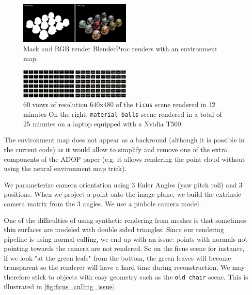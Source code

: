 \begin{figure}[H]
    \centering
    \includegraphics[width=0.5\textwidth]{figures/blenderproc_renders.png}
    \caption{Mask and RGB render BlenderProc renders with an environment map.}
    \label{fig:blenderproc_renders}
\end{figure}

\begin{figure}[H]
    \centering
    \includegraphics[width=0.5\textwidth]{figures/ficus_and_matballs.png}
    \caption{60 views of resolution 640x480 of the \texttt{Ficus} scene rendered in 12 minutes On the right, \texttt{material balls} scene rendered in a total of 25 minutes on a laptop equipped with a Nvidia T500.}
    \label{fig:multiview}
\end{figure}

The environment map does not appear as a backround (although it is possible in the current code) as it would allow to simplify and remove one of the extra components of the ADOP paper (e.g. it allows rendering the point cloud without using the neural environment map trick).

We parameterize camera orientation using 3 Euler Angles (yaw pitch roll) and 3 positions. When we project a point onto the image plane, we build the extrinsic camera matrix from the 3 angles. We use a pinhole camera model.

One of the difficulties of using synthetic rendering from meshes is that sometimes thin surfaces are modeled with double sided triangles. Since our rendering pipeline is using normal culling, we end up with an issue: points with normals not pointing towards the camera are not rendered. So on the ficus scene for instance, if we look "at the green leafs" from the bottom, the green leaves will become transparent so the renderer will have a hard time during reconstruction. We may therefore stick to objects with easy geometry such as the \texttt{old chair} scene. This is illustrated in \cref{fig:ficus_culling_issue}.

